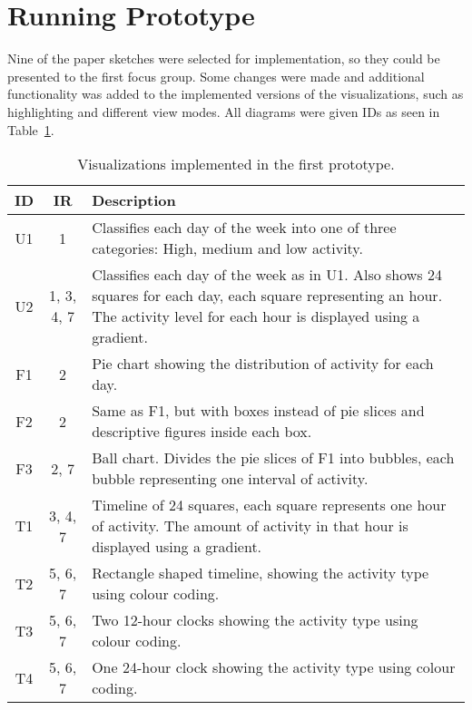 \section{Running Prototype}
\label{sec:runningPrototype1}
Nine of the paper sketches were selected for implementation, so they could be presented to the first focus group. Some changes were made and additional functionality was added to the implemented versions of the visualizations, such as highlighting and different view modes. All diagrams were given IDs as seen in Table~\ref{tab:runProtDesc1}.

\begin{table}[h!]
  \begin{center}
  \begin{tabular}{|c|c|p{10cm}|}
    \hline
    \textbf{ID} & \textbf{IR} & \textbf{Description}\\ \hline
    U1 & 1 & Classifies each day of the week into one of three categories: High, medium and low activity. \\ \hline
    U2 & 1, 3, 4, 7 & Classifies each day of the week as in U1. Also shows 24 squares for each day, each square representing an hour. The activity level for each hour is displayed using a gradient. \\ \hline
    F1 & 2 & Pie chart showing the distribution of activity for each day. \\ \hline
    F2 & 2 & Same as F1, but with boxes instead of pie slices and descriptive figures inside each box.  \\ \hline
    F3 & 2, 7 & Ball chart. Divides the pie slices of F1 into bubbles, each bubble representing one interval of activity. \\ \hline
    T1 & 3, 4, 7 & Timeline of 24 squares, each square represents one hour of activity. The amount of activity in that hour is displayed using a gradient. \\ \hline
    T2 & 5, 6, 7 & Rectangle shaped timeline, showing the activity type using colour coding.  \\ \hline
    T3 & 5, 6, 7 & Two 12-hour clocks showing the activity type using colour coding. \\ \hline
    T4 & 5, 6, 7 & One 24-hour clock showing the activity type using colour coding. \\ \hline
  \end{tabular}
  \end{center}
  \caption[Visualizations in the first prototype]{Visualizations implemented in the first prototype.}
  \label{tab:runProtDesc1}
\end{table}


